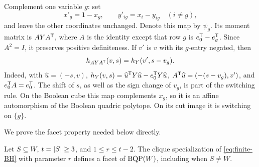 Complement one variable $g$: set
\[
 x'_g=1-x_g,\qquad y'_{ig}=x_i-y_{ig}\quad(i\ne g),
\]
and leave the other coordinates unchanged. Denote this map by $\psi_g$.
Its moment matrix is $AYA^{\mathsf T}$, where $A$ is the identity except that
row $g$ is $e_0^{\mathsf T}-e_g^{\mathsf T}$. Since $A^2=I$, it preserves positive
definiteness. If $v'$ is $v$ with its $g$-entry negated, then
\begin{equation}\label{eq:bh-switching}
 h_{AYA^{\mathsf T}}(v,s)=h_Y(v',s-v_g).
\end{equation}
Indeed, with $\widehat u=(-s,v)$,
$h_Y(v,s)=\widehat u^{\mathsf T} Y\widehat u-e_0^{\mathsf T} Y\widehat u$,
$A^{\mathsf T}\widehat u=(-(s-v_g),v')$, and $e_0^{\mathsf T} A=e_0^{\mathsf T}$.
The shift of $s$, as well as the sign change of $v_g$, is part of the
switching rule. On the Boolean cube this map complements $x_g$, so it
is an affine automorphism of the Boolean quadric polytope. On its cut
image it is switching on $\{g\}$.

We prove the facet property needed below directly.

\begin{lemma}\label{lem:clique-facets}
Let $S\subseteq W$, $t=\left\lvert S\right\rvert\geq3$, and $1\leq r\leq t-2$.
The clique specialization of \eqref{eq:finite-BH} with parameter $r$
defines a facet of $\operatorname{BQP}(W)$, including when $S\ne W$.
\end{lemma}

